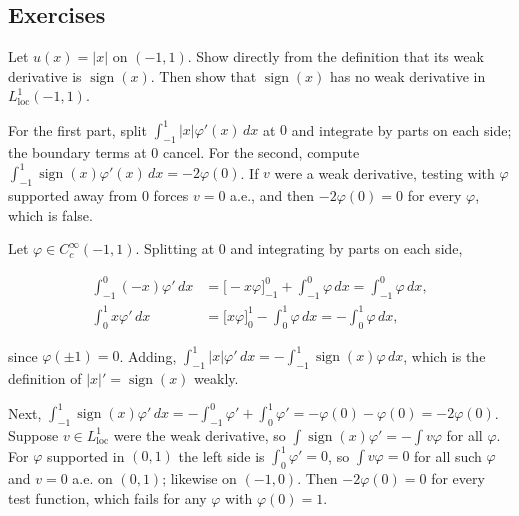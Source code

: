 \subsection*{Exercises}

\begin{exercise}
  Let $u(x) = |x|$ on $(-1,1)$. Show directly from the definition that its weak derivative is $\operatorname{sign}(x)$. Then show that $\operatorname{sign}(x)$ has no weak derivative in $L^1_{\mathrm{loc}}(-1,1)$.
  \begin{hint}
    For the first part, split $\int_{-1}^1 |x|\varphi'(x)\,dx$ at $0$ and integrate by parts on each side; the boundary terms at $0$ cancel. For the second, compute $\int_{-1}^1 \operatorname{sign}(x)\varphi'(x)\,dx = -2\varphi(0)$. If $v$ were a weak derivative, testing with $\varphi$ supported away from $0$ forces $v = 0$ a.e., and then $-2\varphi(0) = 0$ for every $\varphi$, which is false.
  \end{hint}
  \begin{solution}
    Let $\varphi \in C_c^\infty(-1,1)$. Splitting at $0$ and integrating by parts on each side,

    \[ \begin{aligned}
             \int_{-1}^0 (-x)\varphi'\,dx &= \big[-x\varphi\big]_{-1}^0 + \int_{-1}^0 \varphi\,dx = \int_{-1}^0\varphi\,dx, \\
             \int_0^1 x\varphi'\,dx &= \big[x\varphi\big]_0^1 - \int_0^1\varphi\,dx = -\int_0^1\varphi\,dx,
             \end{aligned} \]

    since $\varphi(\pm1) = 0$. Adding, $\int_{-1}^1|x|\varphi'\,dx = -\int_{-1}^1\operatorname{sign}(x)\varphi\,dx$, which is the definition of $|x|' = \operatorname{sign}(x)$ weakly.

    Next, $\int_{-1}^1\operatorname{sign}(x)\varphi'\,dx = -\int_{-1}^0\varphi' + \int_0^1\varphi' = -\varphi(0) - \varphi(0) = -2\varphi(0)$. Suppose $v \in L^1_{\mathrm{loc}}$ were the weak derivative, so $\int\operatorname{sign}(x)\varphi' = -\int v\varphi$ for all $\varphi$. For $\varphi$ supported in $(0,1)$ the left side is $\int_0^1\varphi' = 0$, so $\int v\varphi = 0$ for all such $\varphi$ and $v = 0$ a.e. on $(0,1)$; likewise on $(-1,0)$. Then $-2\varphi(0) = 0$ for every test function, which fails for any $\varphi$ with $\varphi(0) = 1$.
  \end{solution}
\end{exercise}

